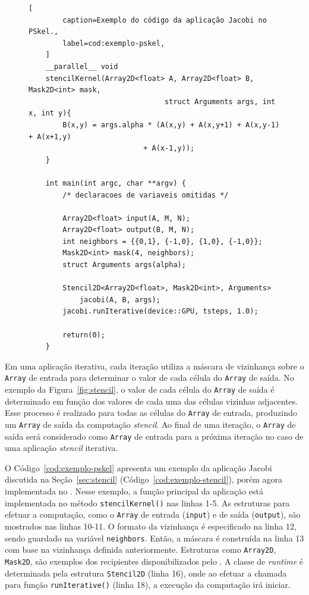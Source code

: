 \begin{figure}[t]
	\begin{lstlisting}[
		caption=Exemplo do código da aplicação Jacobi no PSkel.,
		label=cod:exemplo-pskel,
	]
	__parallel__ void
	stencilKernel(Array2D<float> A, Array2D<float> B, Mask2D<int> mask,
								struct Arguments args, int x, int y){
		B(x,y) = args.alpha * (A(x,y) + A(x,y+1) + A(x,y-1) + A(x+1,y)
                           + A(x-1,y));
	}

	int main(int argc, char **argv) {
		/* declaracoes de variaveis omitidas */

		Array2D<float> input(A, M, N);
		Array2D<float> output(B, M, N);
		int neighbors = {{0,1}, {-1,0}, {1,0}, {-1,0}};
		Mask2D<int> mask(4, neighbors);
		struct Arguments args(alpha);

		Stencil2D<Array2D<float>, Mask2D<int>, Arguments>
			jacobi(A, B, args);
		jacobi.runIterative(device::GPU, tsteps, 1.0);

		return(0);
	}
\end{lstlisting}
\end{figure}

Em uma aplicação \stencil iterativa, cada iteração utiliza a máscara de
vizinhança sobre o \texttt{Array} de entrada para determinar o
valor de cada célula do \texttt{Array} de saída. No exemplo da
Figura~\ref{fig:stencil}, o valor de cada célula do \texttt{Array} de saída é
determinado em função dos valores de cada uma das células vizinhas adjacentes.
Esse processo é realizado para todas as células do \texttt{Array} de entrada,
produzindo um \texttt{Array} de saída da computação \textit{stencil}. Ao final de uma
iteração, o \texttt{Array} de saída será considerado como \texttt{Array} de
entrada para a próxima iteração no caso de uma aplicação \textit{stencil} iterativa.

O Código~\ref{cod:exemplo-pskel} apresenta um exemplo da aplicação Jacobi discutida na
Seção~\ref{sec:stencil} (Código~\ref{cod:exemplo-stencil}), porém agora implementada no \fw \pskel.
Nesse exemplo, a função \stencil principal da aplicação está implementada no método \texttt{stencilKernel()} nas linhas 1-5.
As estruturas para efetuar a computação, como o \texttt{Array} de entrada (\texttt{input}) e de saída (\texttt{output}), são mostrados nas linhas 10-11.
O formato da vizinhança é especificado na linha 12, sendo guardado na variável \texttt{neighbors}.
Então, a máscara é construída na linha 13 com base na vizinhança definida anteriormente.
Estruturas como \texttt{Array2D}, \texttt{Mask2D}, são exemplos dos
recipientes disponibilizados pelo \fw. A classe de \textit{runtime} é
determinada pela estrutura \texttt{Stencil2D} (linha 16), onde ao efetuar a chamada para
função \texttt{runIterative()} (linha 18), a execução da computação irá iniciar.


